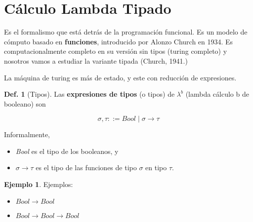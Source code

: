 \documentclass{report}
\theoremstyle{definition} %
\newtheorem{definition}{Def.}[chapter]
\newtheorem*{example*}{Ejemplo}
\newcommand{\lambdab}{\lambda^b}
\newcommand{\tfunc}[2]{#1 \to #2}
\begin{document}
\section{Cálculo Lambda Tipado}

Es el formalismo que está detrás de la programación funcional. Es un modelo de
cómputo basado en \textbf{funciones}, introducido por Alonzo Church en 1934. Es
computacionalmente completo en su versión sin tipos (turing completo) y nosotros
vamos a estudiar la variante tipada (Church, 1941.)

La máquina de turing es más de estado, y este con reducción de expresiones.

\begin{definition}[Tipos]\label{sec:func-lambdab-tipos}
    Las \textbf{expresiones de tipos} (o tipos) de $\lambdab$ (lambda cálculo b
    de booleano) son

    \[
        \sigma, \tau ::= Bool \mid \tfunc{\sigma}{\tau}
    \]

    Informalmente, 
    
    \begin{itemize}
        \item \textit{Bool} es el tipo de los booleanos, y
        \item $\tfunc{\sigma}{\tau}$ es el tipo de las funciones de tipo $\sigma$ en tipo $\tau$.
    \end{itemize}

    \begin{example*}
        Ejemplos:
        \begin{itemize}
            \item $\tfunc{Bool}{Bool}$
            \item $\tfunc{\tfunc{Bool}{Bool}}{Bool}$
        \end{itemize}
    \end{example*}
\end{definition}
\end{document}
